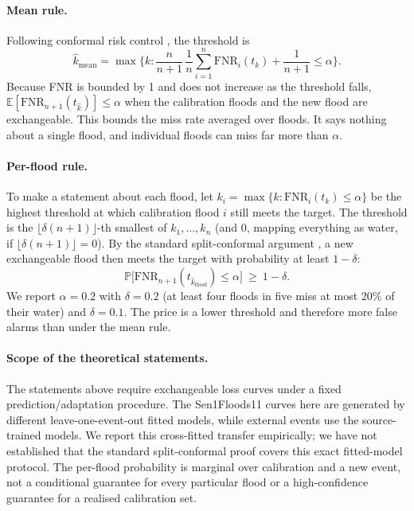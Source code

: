 \documentclass[a4paper,fleqn]{cas-sc}
\begin{document}
\paragraph{Mean rule.} Following conformal risk control \citep{angelopoulos2024crc}, the threshold is
\begin{equation}
\hat{k}_{\mathrm{mean}} = \max\Big\{k : \frac{n}{n+1}\,\frac{1}{n}\sum_{i=1}^{n}\mathrm{FNR}_i(t_k) + \frac{1}{n+1} \le \alpha\Big\}.
\label{eq:mean}
\end{equation}
Because FNR is bounded by 1 and does not increase as the threshold falls, $\mathbb{E}[\mathrm{FNR}_{n+1}(t_{\hat{k}})]\le\alpha$ when the calibration floods and the new flood are exchangeable. This bounds the miss rate averaged over floods. It says nothing about a single flood, and individual floods can miss far more than $\alpha$.

\paragraph{Per-flood rule.} To make a statement about each flood, let $k_i=\max\{k:\mathrm{FNR}_i(t_k)\le\alpha\}$ be the highest threshold at which calibration flood $i$ still meets the target. The threshold is the $\lfloor\delta(n+1)\rfloor$-th smallest of $k_1,\dots,k_n$ (and $0$, mapping everything as water, if $\lfloor\delta(n+1)\rfloor=0$). By the standard split-conformal argument \citep{vovk2022alrw,lei2018distfree}, a new exchangeable flood then meets the target with probability at least $1-\delta$:
\begin{equation}
\mathbb{P}\big[\mathrm{FNR}_{n+1}(t_{\hat{k}_{\mathrm{flood}}})\le\alpha\big]\ \ge\ 1-\delta .
\label{eq:flood}
\end{equation}
We report $\alpha=0.2$ with $\delta=0.2$ (at least four floods in five miss at most 20\% of their water) and $\delta=0.1$. The price is a lower threshold and therefore more false alarms than under the mean rule.

\paragraph{Scope of the theoretical statements.} The statements above require exchangeable loss curves under a fixed prediction/adaptation procedure. The Sen1Floods11 curves here are generated by different leave-one-event-out fitted models, while external events use the source-trained models. We report this cross-fitted transfer empirically; we have not established that the standard split-conformal proof covers this exact fitted-model protocol. The per-flood probability is marginal over calibration and a new event, not a conditional guarantee for every particular flood or a high-confidence guarantee for a realised calibration set.
\end{document}
